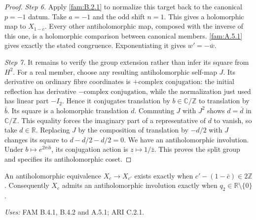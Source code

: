 \begin{proof}
\par\noindent\textit{Step 6.} Apply \ref{fam:B.2.1} to normalize this target back to the canonical $p=-1$ datum. Take $a=-1$ and the odd shift $n=1$. This gives a holomorphic map to $X_{1-\bar c}$. Every other antiholomorphic map, composed with the inverse of this one, is a holomorphic comparison between canonical members. \ref{fam:A.5.1} gives exactly the stated congruence. Exponentiating it gives $w'=-\bar w$.

\par\noindent\textit{Step 7.} It remains to verify the group extension rather than infer its square from $H^2$. For a real member, choose any resulting antiholomorphic self-map $J$. Its derivative on ordinary fibre coordinates is $+\text{complex conjugation}$: the initial reflection has derivative $-\text{complex conjugation}$, while the normalization just used has linear part $-I_2$. Hence it conjugates translation by $b\in\mathbb C/\mathbb Z$ to translation by $\bar b$. Its square is a holomorphic translation $d$. Commuting $J$ with $J^2$ shows $d=\bar d$ in $\mathbb C/\mathbb Z$. This equality forces the imaginary part of a representative of $d$ to vanish, so take $d\in\mathbb R$. Replacing $J$ by the composition of translation by $-d/2$ with $J$ changes its square to $d-d/2-d/2=0$. We have an antiholomorphic involution. Under $b\mapsto e^{2\pi ib}$, its conjugation action is $z\mapsto1/\bar z$. This proves the split group and specifies its antiholomorphic coset.
\end{proof}

\begin{theorem}[ARI C.2.2; T]\label{ari:C.2.2}
An antiholomorphic equivalence $X_c\to X_{c'}$ exists exactly when
$c'-(1-\bar c)\in2\mathbb Z$. Consequently $X_c$ admits an
antiholomorphic involution exactly when $q_2\in\mathbb R\setminus\{0\}$.
\end{theorem}
\noindent\emph{Uses:} FAM B.4.1, B.4.2 and A.5.1; ARI C.2.1.\par

